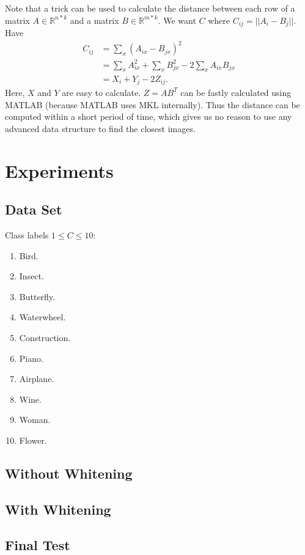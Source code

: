 \documentclass{acm_proc_article-sp}
\begin{document}
Note that a trick can be used to calculate the distance
between each row of a matrix $A\in\mathbb{R}^{n*k}$ 
and a matrix $B\in\mathbb{R}^{m*k}$.
We want $C$ where $C_{ij}=||A_i - B_j||$. Have
\begin{align*}
    C_{ij} &= \sum_x {(A_{ix} - B_{jx})}^2 \\
           &= \sum_x A_{ix}^2 + \sum_x B_{jx}^2 - 2 \sum_x A_{ix} B_{jx} \\
           &= X_i + Y_j - 2 Z_{ij}.
\end{align*}
Here, $X$ and $Y$ are easy to calculate.
$Z=AB^T$ can be fastly calculated using MATLAB (because MATLAB uses MKL
internally).
Thus the distance can be computed within a short period of time,
    which gives us no reason to
    use any advanced data structure
    to find the closest images.

\section{Experiments}

\subsection{Data Set}
Class labels $1\leq C \leq 10$:
\begin{enumerate}[1.]
\item Bird.
\item Insect.
\item Butterfly.
\item Waterwheel.
\item Construction.
\item Piano.
\item Airplane.
\item Wine.
\item Woman.
\item Flower.
\end{enumerate}

\subsection{Without Whitening}

\subsection{With Whitening}

\subsection{Final Test}
\end{document}
